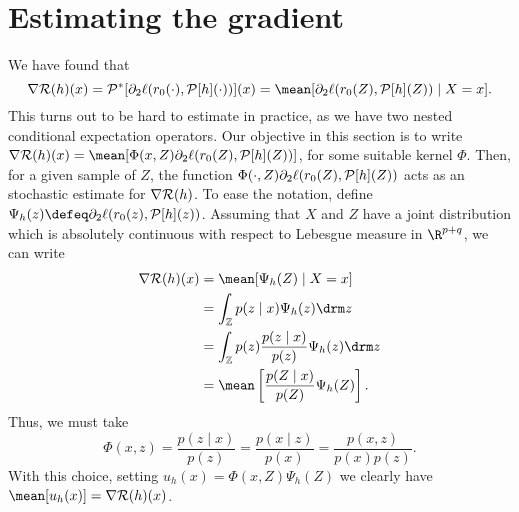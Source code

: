 \section{Estimating the gradient}

We have found that
\begin{equation*}
    \nabla \risk ( h ) ( x )
    = \meanop^{ * } [ \partial_{ 2 } \ell ( r_{ 0 } ( \cdot ), \meanop [ h ] ( \cdot ) ) ] ( x )
    = \mean [ \partial_{ 2 } \ell ( r_{ 0 } ( Z ), \meanop [ h ] ( Z ) ) \mid X = x ]
.\end{equation*}
This turns out to be hard to estimate in practice, as we have two nested conditional expectation operators.
Our objective in this section is to
write $ \nabla \risk ( h ) ( x ) = \mean [ \Phi ( x, Z ) \partial_{ 2 } \ell ( r_{ 0 } ( Z ), \meanop [ h ] ( Z ) ) ] $, for some suitable kernel $ \Phi $.
Then, for a given sample of $ Z $, the function $ \Phi ( \cdot, Z ) \partial_{ 2 } \ell ( r_{ 0 } ( Z ), \mathcal{P} [ h ] ( Z ) ) $ acts as an stochastic estimate for $ \nabla \mathcal{R} ( h ) $.
To ease the notation, define $ \Psi_{ h } ( z ) \defeq \partial_{ 2 } \ell ( r_{ 0 } ( z ), \meanop [ h ] ( z ) ) $.
Assuming that $ X $ and $ Z $ have a joint distribution which is absolutely continuous with respect to Lebesgue measure in $ \R^{ p + q } $, we can write
\begin{align*}
    \nabla \risk ( h ) ( x )
    &= \mean [ \Psi_{ h } ( Z ) \mid X = x ] \\
    &= \int_{ \mathbb{Z} } p ( z \mid x ) \Psi_{ h } ( z ) \drm z \\
    &= \int_{ \mathbb{Z} } p ( z ) \frac{ p ( z \mid x ) }{ p ( z ) } \Psi_{ h } ( z ) \drm z \\
    &= \mean \left[
        \frac{ p ( Z \mid x ) }{ p ( Z ) } \Psi_{ h } ( Z )
    \right]
.\end{align*}
Thus, we must take
\begin{equation*}
    \Phi ( x, z )
    = \frac{ p ( z \mid x ) }{ p ( z ) }
    = \frac{ p ( x \mid z ) }{ p ( x ) }
    = \frac{ p ( x, z ) }{ p ( x ) p ( z ) }
.\end{equation*}
With this choice, setting $ u_{ h } ( x ) = \Phi ( x, Z ) \Psi_{ h } ( Z ) $ we clearly have $ \mean [ u_{ h } ( x ) ] = \nabla \risk ( h ) ( x ) $.

